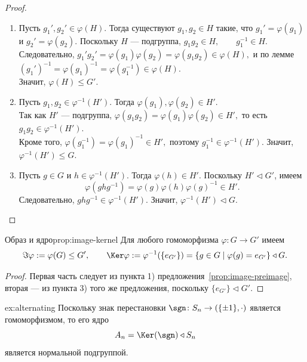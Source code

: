 \begin{proof}
	\begin{enumerate}
		\item Пусть $g_1',g_2'\in \varphi(H)$. Тогда существуют $g_1,g_2\in H$ такие, что $g_1'=\varphi(g_1)$ и $g_2'=\varphi(g_2)$. Поскольку $H$ --- подгруппа, $g_1g_2\in H, \qquad g_1^{-1}\in H.$\\
		Следовательно, $g_1'g_2' = \varphi(g_1)\varphi(g_2)=\varphi(g_1g_2)\in \varphi(H),$ и по лемме $(g_1')^{-1}=\varphi(g_1)^{-1}=\varphi(g_1^{-1})\in \varphi(H).$\\
		Значит, $\varphi(H)\le G'$.
		
		\item Пусть $g_1,g_2\in \varphi^{-1}(H')$. Тогда $\varphi(g_1),\varphi(g_2)\in H'$.\\
		Так как $H'$ --- подгруппа, $\varphi(g_1g_2)=\varphi(g_1)\varphi(g_2)\in H',$ то есть $g_1g_2\in \varphi^{-1}(H')$.\\
		Кроме того, $\varphi(g_1^{-1})=\varphi(g_1)^{-1}\in H',$ поэтому $g_1^{-1}\in \varphi^{-1}(H')$. Значит, $\varphi^{-1}(H')\le G$.
		
		\item Пусть $g\in G$ и $h\in \varphi^{-1}(H')$. Тогда $\varphi(h)\in H'$. Поскольку $H'\triangleleft G'$, имеем
		\[
		\varphi(ghg^{-1})=\varphi(g)\varphi(h)\varphi(g)^{-1}\in H'.
		\]
		Следовательно, $ghg^{-1}\in \varphi^{-1}(H')$. Значит, $\varphi^{-1}(H')\triangleleft G$.
	\end{enumerate}
\end{proof}

\begin{Corollary}{Образ и ядро}{prop:image-kernel}
	Для любого гомоморфизма $\varphi\colon G\to G'$ имеем
	\[
	\Im \varphi := \varphi(G) \le G',
	\qquad
	\Ker \varphi := \varphi^{-1}(\{e_{G'}\}) = \{g\in G \mid \varphi(g)=e_{G'}\} \triangleleft G.
	\]
\end{Corollary}

\begin{proof}
	Первая часть следует из пункта 1) предложения~\ref{prop:image-preimage}, вторая --- из пункта 3) того же предложения, поскольку $\{e_{G'}\} \triangleleft G'$.
\end{proof}

\begin{Example}{}{ex:alternating}
	Поскольку знак перестановки $\sgn \colon S_n \to (\{ \pm 1 \}, \cdot)$ является гомоморфизмом, то его ядро
	\[
	A_n = \Ker(\sgn) \triangleleft S_n
	\]
	является нормальной подгруппой.
\end{Example}

